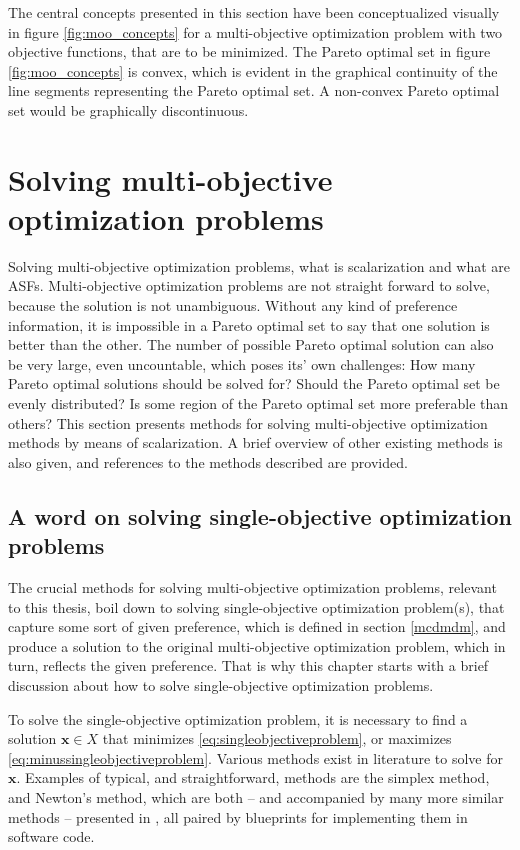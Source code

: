 The central concepts presented in this section have been conceptualized visually in figure \ref{fig:moo_concepts}
for a multi-objective optimization problem with two objective functions, that are to be minimized.
The Pareto optimal set in figure \ref{fig:moo_concepts} is convex, which is evident in the graphical continuity
of the line segments representing the Pareto optimal set. A non-convex Pareto optimal set would be graphically discontinuous.

\section{Solving multi-objective optimization problems}
\label{mcdmsolve}
{\color{red}
Solving multi-objective optimization problems, what is scalarization and what are ASFs.
}
Multi-objective optimization problems are not straight forward to solve, because the solution is not unambiguous. Without
any kind of preference information, it is impossible in a Pareto optimal set to say that one solution is better than the other.
The number of possible Pareto optimal solution can also be very large, even uncountable, which poses its' own challenges: How many
Pareto optimal solutions should be solved for? Should the Pareto optimal set be evenly distributed? Is some region of the Pareto optimal
set more preferable than others? This section presents methods for solving multi-objective optimization methods by means of scalarization.
A brief overview of other existing methods is also given, and references to the methods described are provided.

\subsection{A word on solving single-objective optimization problems}
\label{solvingsingle}
The crucial methods for solving multi-objective optimization problems, relevant to this thesis, boil down to solving
single-objective optimization problem(s), that capture some sort of given preference, which is defined in section \ref{mcdmdm},
and produce a
solution to the original multi-objective optimization problem, which in turn, reflects the given preference. That is why this chapter
starts with a brief discussion about how to solve single-objective optimization problems.

To solve the single-objective optimization problem, it is necessary to find a solution
$\mathbf{x} \in X$ that minimizes \eqref{eq:singleobjectiveproblem}, or maximizes \eqref{eq:minussingleobjectiveproblem}. 
Various methods exist in literature to solve for $\mathbf{x}$.
Examples of typical, and straightforward, methods are the simplex method,
and Newton's method, which are both -- and accompanied by many more similar methods --
presented in \cite[chapter 9 and 10]{williampress2007}, all paired by blueprints for implementing them in software code.

